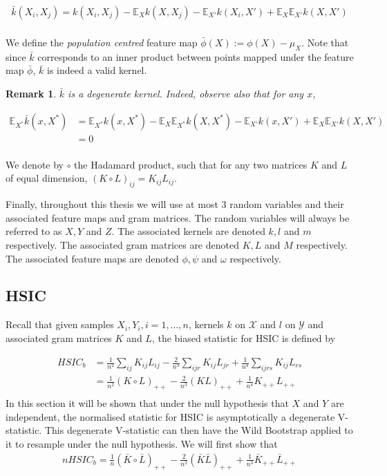 \documentclass[12pt]{article}
\newtheorem*{remark}{Remark}
\numberwithin{claim}{section}
\numberwithin{lemma}{section}
\numberwithin{theorem}{section}
\begin{document}
\begin{align*}
\bar{k}(X_i,X_j) = k(X_i,X_j)  -  \mathbb{E}_X k(X,X_j) -  \mathbb{E}_{X'} k(X_i,X') +   \mathbb{E}_X \mathbb{E}_{X'} k(X,X') \\
\end{align*}

We define the \emph{population centred} feature map $\bar{\phi}(X) := \phi(X) - \mu_X$. Note that since $\bar{k}$ corresponds to an inner product between points mapped under the feature map $\bar{\phi}$, $\bar{k}$ is indeed a valid kernel.

\begin{remark}
$\bar{k}$ is a degenerate kernel. Indeed, observe also that for any $x$,

\begin{align*}
\mathbb{E}_{X^*}\bar{k}(x,X^*) & =  \mathbb{E}_{X^*}k(x,X^*)  -  \mathbb{E}_X \mathbb{E}_{X^*} k(X,X^*) -  \mathbb{E}_{X'} k(x,X') +   \mathbb{E}_X \mathbb{E}_{X'} k(X,X') \\
& = 0\\
\end{align*}
\end{remark}

We denote by $\circ$ the Hadamard product, such that for any two matrices $K$ and $L$ of equal dimension, $(K\circ L)_{ij} = K_{ij}L_{ij}$.

Finally, throughout this thesis we will use at most 3 random variables and their associated feature maps and gram matrices. The random variables will always be referred to as $X, Y$ and $Z$. The associated kernels are denoted $k, l$ and $m$ respectively. The associated gram matrices are denoted $K, L$ and $M$ respectively. The associated feature maps are denoted $\phi, \psi$ and $\omega$ respectively.


\subsection{HSIC}

Recall that given samples $X_i, Y_i,  i=1,\ldots,n$, kernels $k$ on $\mathcal{X}$ and $l$ on $\mathcal{Y}$ and associated gram matrices $K$ and $L$, the biased statistic for HSIC is defined by

\begin{align*}
HSIC_b &= \frac{1}{n^2}\sum_{ij}K_{ij}L_{ij} - \frac{2}{n^3}\sum_{ijr}K_{ij}L_{jr} + \frac{1}{n^4}\sum_{ijrs}K_{ij}L_{rs}\\
& = \frac{1}{n^2}(K\circ L)_{++} - \frac{2}{n^3}(KL)_{++} + \frac{1}{n^4}K_{++}L_{++}\\
\end{align*}
In this section it will be shown that under the null hypothesis that $X$ and $Y$ are independent, the normalised statistic for HSIC is asymptotically a degenerate V-statistic. This degenerate V-statistic can then have the Wild Bootstrap applied to it to resample under the null hypothesis. We will first show that
\begin{align*}
nHSIC_b = \frac{1}{n}(\bar{K}\circ \bar{L})_{++} - \frac{2}{n^2}(\bar{K}\bar{L})_{++} + \frac{1}{n^3}\bar{K}_{++}\bar{L}_{++} \tag{$\dagger$}\\
\end{align*}
\end{document}

